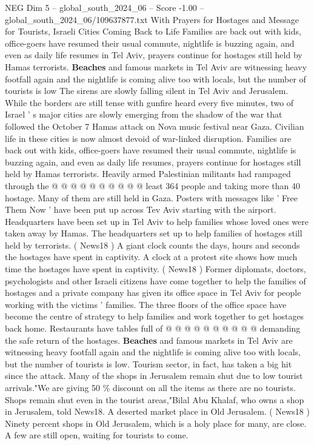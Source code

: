 \begin{textsample}{NEG Dim 5 – global\_south\_2024\_06 – Score -1.00 – global\_south\_2024\_06/109637877.txt}  \label{ex:f5_neg_235}
With Prayers for Hostages and Message for Tourists, Israeli Cities Coming Back to Life Families are back out with kids, office-goers have resumed their usual commute, nightlife is buzzing again, and even as daily life resumes in Tel Aviv, prayers continue for hostages still held by Hamas terrorists. \textbf{Beaches} and famous markets in Tel Aviv are witnessing heavy footfall again and the nightlife is coming alive too with locals, but the number of tourists is low The sirens are slowly falling silent in Tel Aviv and Jerusalem.
While the borders are still tense with gunfire heard every five minutes, two of Israel ' s major cities are slowly emerging from the shadow of the war that followed the October 7 Hamas attack on Nova music festival near Gaza.
Civilian life in these cities is now almost devoid of war-linked disruption.
Families are back out with kids, office-goers have resumed their usual commute, nightlife is buzzing again, and even as daily life resumes, prayers continue for hostages still held by Hamas terrorists.
Heavily armed Palestinian militants had rampaged through the @ @ @ @ @ @ @ @ @ @ least 364 people and taking more than 40 hostage.
Many of them are still held in Gaza.
Posters with messages like ' Free Them Now ' have been put up across Tev Aviv starting with the airport.
Headquarters have been set up in Tel Aviv to help families whose loved ones were taken away by Hamas.
The headquarters set up to help families of hostages still held by terrorists. ( News18 ) A giant clock counts the days, hours and seconds the hostages have spent in captivity.
A clock at a protest site shows how much time the hostages have spent in captivity. ( News18 ) Former diplomats, doctors, psychologists and other Israeli citizens have come together to help the families of hostages and a private company has given its office space in Tel Aviv for people working with the victims ' families.
The three floors of the office space have become the centre of strategy to help families and work together to get hostages back home.
Restaurants have tables full of @ @ @ @ @ @ @ @ @ @ demanding the safe return of the hostages. \textbf{Beaches} and famous markets in Tel Aviv are witnessing heavy footfall again and the nightlife is coming alive too with locals, but the number of tourists is low.
Tourism sector, in fact, has taken a big hit since the attack.
Many of the shops in Jerusalem remain shut due to low tourist arrivals."We are giving 50 \% discount on all the items as there are no tourists.
Shops remain shut even in the tourist areas,"Bilal Abu Khalaf, who owns a shop in Jerusalem, told News18.
A deserted market place in Old Jerusalem. ( News18 ) Ninety percent shops in Old Jerusalem, which is a holy place for many, are close.
A few are still open, waiting for tourists to come.

\end{textsample}
